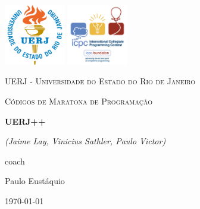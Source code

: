 \documentclass[oneside]{book}
\begin{document}
\begin{titlepage}
	\centering

	\includegraphics[width=0.20\textwidth]{./uerj-logo.png}\vspace{1.3cm}
	\includegraphics[width=0.20\textwidth]{./icpc-logo.png}\par\vspace{1.3cm}
	{\scshape\LARGE UERJ - Universidade do Estado do Rio de Janeiro \par}
	\vspace{1cm}
	{\scshape\Large Códigos de Maratona de Programação\par}
	\vspace{1.5cm}
	{\huge\bfseries UERJ++\par}
	\vspace{2cm}
	{\Large\itshape (Jaime Lay, Vinicius Sathler, Paulo Victor)\par}
	\vfill
	coach\par
	Paulo Eustáquio

	\vfill

	{\large \today\par}
\end{titlepage}
\tableofcontents




\end{document}
